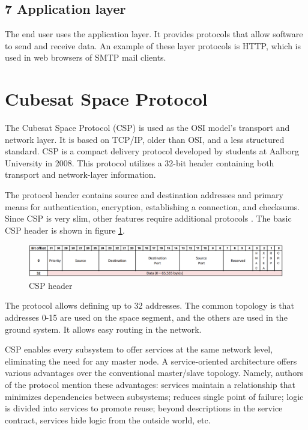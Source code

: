 \documentclass[conference]{IEEEtran}
\begin{document}
\subsection{7 Application layer}
The end user uses the application layer. It provides protocols that allow software to send and receive data. An example of these layer protocols is HTTP, which is used in web browsers of SMTP mail clients.

\section{Cubesat Space Protocol}
The Cubesat Space Protocol (CSP) is used as the OSI model's transport and network layer. It is based on TCP/IP, older than OSI, and a less structured standard. CSP is a compact delivery protocol developed by students at Aalborg University in 2008. This protocol utilizes a 32-bit header containing both transport and network-layer information.\cite{Mineo-Wakita}

The protocol header contains source and destination addresses and primary means for authentication, encryption, establishing a connection, and checksums. Since CSP is very slim, other features require additional protocols \cite{grillmayer}. The basic CSP header is shown in figure \ref{csp-header}.

\begin{figure}[htbp]
    \centerline{\includegraphics[width=\linewidth]{images/csp-header}}
    \caption{CSP header \cite{grillmayer}}
    \label{csp-header}
\end{figure}

The protocol allows defining up to 32 addresses. The common topology is that addresses 0-15 are used on the space segment, and the others are used in the ground system. It allows easy routing in the network.\cite{GomSpace}

CSP enables every subsystem to offer services at the same network level, eliminating the need for any master node. A service-oriented architecture offers various advantages over the conventional master/slave topology. Namely, authors of the protocol mention these advantages: services maintain a relationship that minimizes dependencies between subsystems; reduces single point of failure; logic is divided into services to promote reuse; beyond descriptions in the service contract, services hide logic from the outside world, etc. 
\end{document}
